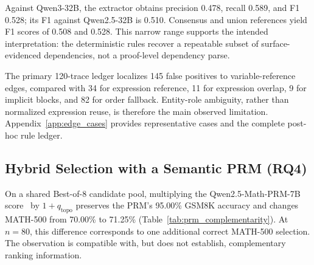 Against Qwen3-32B, the extractor obtains precision 0.478, recall 0.589, and F1 0.528; its F1 against Qwen2.5-32B is 0.510. Consensus and union references yield F1 scores of 0.508 and 0.528. This narrow range supports the intended interpretation: the deterministic rules recover a repeatable subset of surface-evidenced dependencies, not a proof-level dependency parse.

The primary 120-trace ledger localizes 145 false positives to variable-reference edges, compared with 34 for expression reference, 11 for expression overlap, 9 for implicit blocks, and 82 for order fallback. Entity-role ambiguity, rather than normalized expression reuse, is therefore the main observed limitation. Appendix~\ref{app:edge_cases} provides representative cases and the complete post-hoc rule ledger.

\subsection{Hybrid Selection with a Semantic PRM (RQ4)}
\label{sec:rq4}



On a shared Best-of-8 candidate pool, multiplying the Qwen2.5-Math-PRM-7B score~\citep{zhang2025qwen25mathprm} by $1+q_{\mathrm{topo}}$ preserves the PRM's 95.00\% GSM8K accuracy and changes MATH-500 from 70.00\% to 71.25\% (Table~\ref{tab:prm_complementarity}). At $n=80$, this difference corresponds to one additional correct MATH-500 selection. The observation is compatible with, but does not establish, complementary ranking information.

